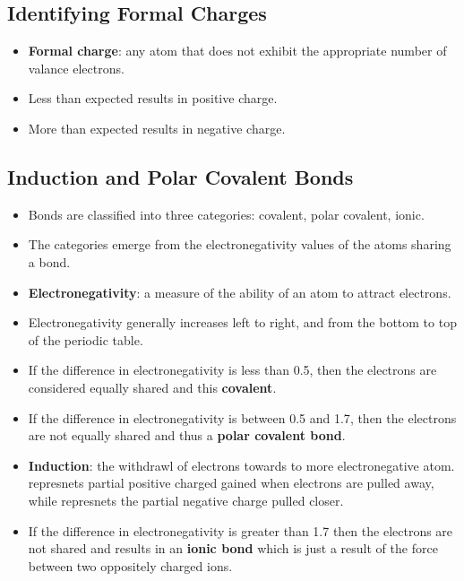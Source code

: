 \documentclass[12pt,a4paper]{article}
\begin{document}
\subsection{Identifying Formal Charges}
\begin{itemize}
    \item \textbf{Formal charge}: any atom that does not exhibit the appropriate number of valance electrons. 
    \item {\color{pos}Less} than expected results in {\color{pos} positive} charge.
    \item {\color{neg}More} than expected results in {\color{neg}negative} charge.
\end{itemize}

\subsection{Induction and Polar Covalent Bonds}
\begin{itemize}
    \item Bonds are classified into three categories: covalent, polar covalent, ionic.
    \item The categories emerge from the electronegativity values of the atoms sharing a bond.
    \item \textbf{Electronegativity}: a measure of the ability of an atom to attract electrons.
    \item Electronegativity generally {\color{o-Sun}increases left to right}, and from the {\color{o-Sun}bottom to top} of the periodic table.
    \item If the difference in electronegativity is {\color{o-Sun}less than 0.5}, then the electrons are considered equally shared and this {\color{o-Sun}\textbf{covalent}}.
    \item If the difference in electronegativity is {\color{o-Sun}between 0.5 and 1.7}, then the electrons are not equally shared and thus a {\color{o-Sun}\textbf{polar covalent bond}}.
    \item \textbf{Induction}: the withdrawl of electrons towards to more electronegative atom. {\color{pos}\ch{$\delta$^+}} represnets partial positive charged gained when electrons are pulled away, while {\color{neg}\ch{$\delta$^-}} represnets the partial negative charge pulled closer.
    \item If the difference in electronegativity is {\color{o-Sun}greater than 1.7} then the electrons are not shared and results in an {\color{o-Sun}\textbf{ionic bond}} which is just a result of the force between two oppositely charged ions. 
\end{itemize}
\end{document}
